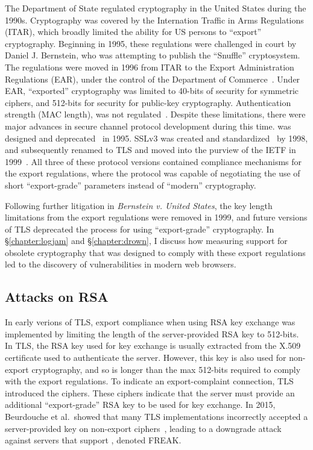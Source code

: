 The Department of State regulated cryptography in the United States during
the 1990s. Cryptography was covered by the Internation Traffic in Arms
Regulations (ITAR), which broadly limited the ability for US persons to
``export'' cryptography. Beginning in 1995, these regulations were challenged
in court by Daniel J. Bernstein, who was attempting to publish the
``Snuffle'' cryptosystem. The regulations were moved in 1996 from ITAR to the
Export Administration Regulations (EAR), under the control of the Department
of Commerce~\cite{djb-case-status}. Under EAR, ``exported'' cryptography was
limited to 40-bits of security for symmetric ciphers, and 512-bits for
security for public-key cryptography. Authentication strength (\eg MAC
length), was not regulated~\cite{ear-2001-cat-5}. Despite these limitations,
there were major advances in secure channel protocol development during this time.
\ssltwo was designed and deprecated~\cite{sslv2} in 1995. SSLv3 was created and
standardized~\cite{rfc6101} by 1998, and subsequently renamed to TLS and
moved into the purview of the IETF in 1999~\cite{rfc2246}. All three of these
protocol versions contained compliance mechanisms for the export regulations,
where the protocol was capable of negotiating the use of short
``export-grade'' parameters instead of ``modern'' cryptography.

Following further litigation in \textit{Bernstein v. United States}, the key
length limitations from the export regulations were removed in 1999, and
future versions of TLS deprecated the process for using ``export-grade''
cryptography. In \S\ref{chapter:logjam} and \S\ref{chapter:drown}, I discuss
how measuring support for obsolete cryptography that was designed to comply
with these export regulations led to the discovery of vulnerabilities in
modern web browsers.

\subsection{Attacks on RSA}

In early verions of TLS, export compliance when using RSA key exchange was
implemented by limiting the length of the server-provided RSA key to
512-bits. In TLS, the RSA key used for key exchange is usually extracted from
the X.509 certificate used to authenticate the server. However, this key is
also used for non-export cryptography, and so is longer than the max 512-bits
required to comply with the export regulations. To indicate an
export-complaint connection, TLS introduced the \rsaexp{} ciphers. These
ciphers indicate that the server must provide an additional ``export-grade''
RSA key to be used for key exchange. In 2015, Beurdouche et al.\ showed that
many TLS implementations incorrectly accepted a server-provided \rsaexp{} key
on non-export \rsa{} ciphers~\cite{freak-attack-2015}, leading to a downgrade
attack against servers that support \rsaexp{}, denoted FREAK.

